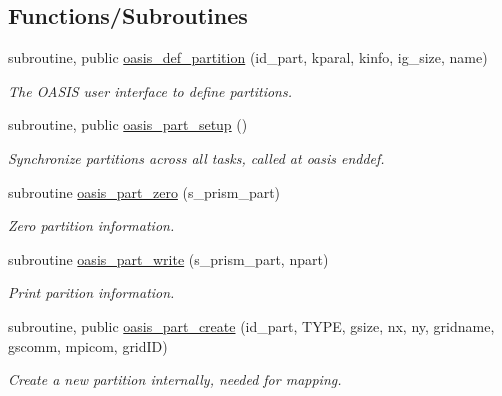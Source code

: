 \subsection*{Functions/\+Subroutines}
\begin{DoxyCompactItemize}
\item 
subroutine, public \hyperlink{namespacemod__oasis__part_af070605328f2b705735d7fbf8b838ff4}{oasis\+\_\+def\+\_\+partition} (id\+\_\+part, kparal, kinfo, ig\+\_\+size, name)
\begin{DoxyCompactList}\small\item\em The O\+A\+S\+IS user interface to define partitions. \end{DoxyCompactList}\item 
subroutine, public \hyperlink{namespacemod__oasis__part_a80f66cc0ce5857aa53d070861f05b521}{oasis\+\_\+part\+\_\+setup} ()
\begin{DoxyCompactList}\small\item\em Synchronize partitions across all tasks, called at oasis enddef. \end{DoxyCompactList}\item 
subroutine \hyperlink{namespacemod__oasis__part_a17c747bc29d25b558df42524bd63ac90}{oasis\+\_\+part\+\_\+zero} (s\+\_\+prism\+\_\+part)
\begin{DoxyCompactList}\small\item\em Zero partition information. \end{DoxyCompactList}\item 
subroutine \hyperlink{namespacemod__oasis__part_a12edb4b0248a3f562fe5f6e16eede06a}{oasis\+\_\+part\+\_\+write} (s\+\_\+prism\+\_\+part, npart)
\begin{DoxyCompactList}\small\item\em Print parition information. \end{DoxyCompactList}\item 
subroutine, public \hyperlink{namespacemod__oasis__part_aacc20c24f42edbef4ec2610bf98aadfc}{oasis\+\_\+part\+\_\+create} (id\+\_\+part, T\+Y\+PE, gsize, nx, ny, gridname, gscomm, mpicom, grid\+ID)
\begin{DoxyCompactList}\small\item\em Create a new partition internally, needed for mapping. \end{DoxyCompactList}\end{DoxyCompactItemize}
